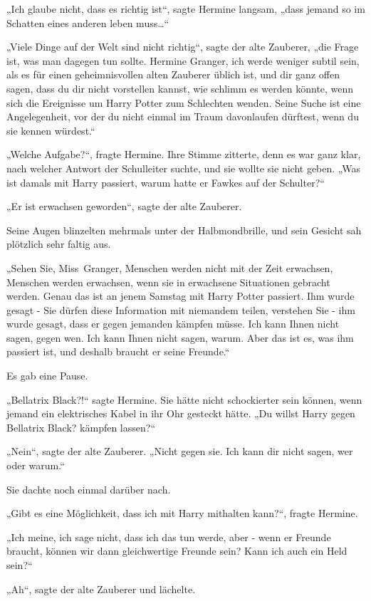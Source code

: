 {„Ich glaube nicht, dass es richtig ist“, sagte Hermine langsam, „dass jemand so im Schatten eines anderen leben muss…“

„Viele Dinge auf der Welt sind nicht richtig“, sagte der alte Zauberer, „die Frage ist, was man dagegen tun sollte. Hermine Granger, ich werde weniger subtil sein, als es für einen geheimnisvollen alten Zauberer üblich ist, und dir ganz offen sagen, dass du dir nicht vorstellen kannst, wie schlimm es werden könnte, wenn sich die Ereignisse um Harry Potter zum Schlechten wenden. Seine Suche ist eine Angelegenheit, vor der du nicht einmal im Traum davonlaufen dürftest, wenn du sie kennen würdest.“

„Welche Aufgabe?“, fragte Hermine. Ihre Stimme zitterte, denn es war ganz klar, nach welcher Antwort der Schulleiter suchte, und sie wollte sie nicht geben. „Was ist damals mit Harry passiert, warum hatte er Fawkes auf der Schulter?“

„Er ist erwachsen geworden“, sagte der alte Zauberer.

Seine Augen blinzelten mehrmals unter der Halbmondbrille, und sein Gesicht sah plötzlich sehr faltig aus.

„Sehen Sie, Miss~Granger, Menschen werden nicht mit der Zeit erwachsen, Menschen werden erwachsen, wenn sie in erwachsene Situationen gebracht werden. Genau das ist an jenem Samstag mit Harry Potter passiert. Ihm wurde gesagt - Sie dürfen diese Information mit niemandem teilen, verstehen Sie - ihm wurde gesagt, dass er gegen jemanden kämpfen müsse. Ich kann Ihnen nicht sagen, gegen wen. Ich kann Ihnen nicht sagen, warum. Aber das ist es, was ihm passiert ist, und deshalb braucht er seine Freunde.“

Es gab eine Pause.

„Bellatrix Black?!“ sagte Hermine. Sie hätte nicht schockierter sein können, wenn jemand ein elektrisches Kabel in ihr Ohr gesteckt hätte. „Du willst Harry gegen Bellatrix Black? kämpfen lassen?“

„Nein“, sagte der alte Zauberer. „Nicht gegen sie. Ich kann dir nicht sagen, wer oder warum.“

Sie dachte noch einmal darüber nach.

„Gibt es eine Möglichkeit, dass ich mit Harry mithalten kann?“, fragte Hermine.

„Ich meine, ich sage nicht, dass ich das tun werde, aber - wenn er Freunde braucht, können wir dann gleichwertige Freunde sein? Kann ich auch ein Held sein?“

„Ah“, sagte der alte Zauberer und lächelte.

}
